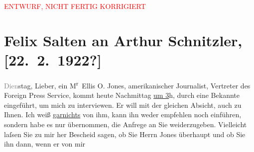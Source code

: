 
\begin{center}
            \textcolor{red}{ENTWURF, NICHT FERTIG KORRIGIERT}
                      \end{center}
            
         
         \renewcommand{\erwaehntePersonen}{Personen: Paul Claudel, Ellis Oliver Jones}
         \renewcommand{\erwaehnteInstitutionen}{Institutionen: Foreign Press Service}
         \renewcommand{\erwaehnteOrte}{Orte: Vereinigte Staaten von Amerika (USA), Wien}
         \renewcommand{\erwaehnteWerke}{Werke: Der Tausch. Drama in drei Akten}
               \section[Felix Salten an Arthur Schnitzler, {[}22. 2. 1922?{]}]{ Felix Salten an Arthur Schnitzler, {[}22. 2. 1922?{]}}\nopagebreak{}\rehead{ }\begin{ledgroupsized}[t]{13cm}\normalsize\beginnumbering \toendnotes[C]{\smallbreak\pagebreak[2]} 
\toendnotes[C]{\smallbreak}\pstart
           \raggedleft{}{\pb}\textcolor{gray}{Dien}stag,\pend
           \pstart{}Lieber,\pend\pstart
           ein M\textsuperscript{r} Ellis O.
                  Jones, amerikanischer Journalist,
               Vertreter des Foreign Press Service, kommt heute
               Nachmittag \uline{um 3}h, durch eine Bekannte eingeführt, um
               mich zu interviewen. Er will mit der gleichen Absicht, auch zu Ihnen. Ich weiß \uline{garnichts} von ihm, kann ihn weder empfehlen noch
               einführen, sondern habe es nur übernommen, die Anfrege an Sie weiderzugeben.
               Vielleicht laſsen Sie zu mir her Bescheid sagen, ob Sie Herrn Jones überhaupt und ob Sie ihn dann, wenn er von mir

\end{ledgroupsized}
